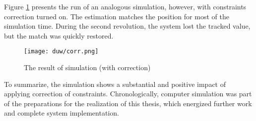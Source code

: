 Figure \ref{corr} presents the run of an analogous simulation, however,  with constraints correction turned on. The estimation matches the position for most of the simulation time. During the second revolution, the system lost the tracked value, but the match was quickly restored.

\begin{figure}[!h]
	\centering
	\texttt{[image: duw/corr.png]}
	\caption{The result of simulation (with correction)}
	\label{corr}
\end{figure}

\newpage
To summarize, the simulation shows a substantial and positive impact of applying correction of constraints. Chronologically, computer simulation was part of the preparations for the realization of this thesis, which energized further work and complete system implementation.